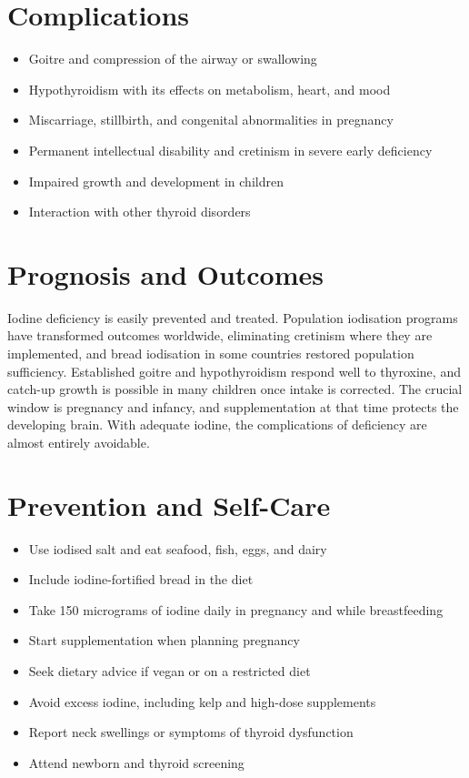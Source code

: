 \section*{Complications}
\begin{itemize}
    \item Goitre and compression of the airway or swallowing
    \item Hypothyroidism with its effects on metabolism, heart, and mood
    \item Miscarriage, stillbirth, and congenital abnormalities in pregnancy
    \item Permanent intellectual disability and cretinism in severe early deficiency
    \item Impaired growth and development in children
    \item Interaction with other thyroid disorders
\end{itemize}

\section*{Prognosis and Outcomes}
Iodine deficiency is easily prevented and treated. Population iodisation programs have transformed outcomes worldwide, eliminating cretinism where they are implemented, and bread iodisation in some countries restored population sufficiency. Established goitre and hypothyroidism respond well to thyroxine, and catch-up growth is possible in many children once intake is corrected. The crucial window is pregnancy and infancy, and supplementation at that time protects the developing brain. With adequate iodine, the complications of deficiency are almost entirely avoidable.

\section*{Prevention and Self-Care}
\begin{itemize}
    \item Use iodised salt and eat seafood, fish, eggs, and dairy
    \item Include iodine-fortified bread in the diet
    \item Take 150 micrograms of iodine daily in pregnancy and while breastfeeding
    \item Start supplementation when planning pregnancy
    \item Seek dietary advice if vegan or on a restricted diet
    \item Avoid excess iodine, including kelp and high-dose supplements
    \item Report neck swellings or symptoms of thyroid dysfunction
    \item Attend newborn and thyroid screening
\end{itemize}

